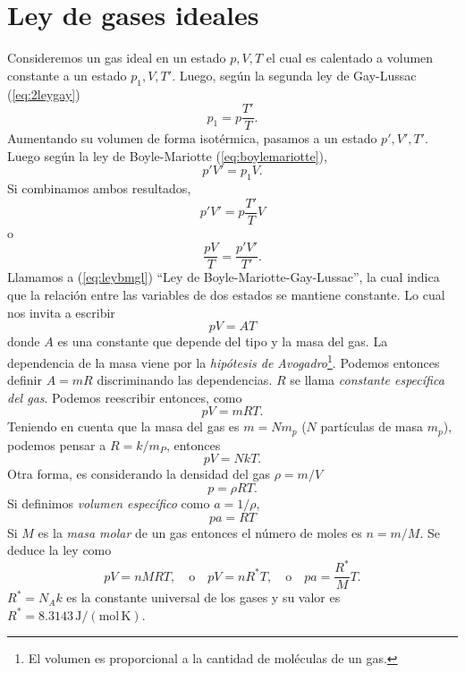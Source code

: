 \documentclass[openany]{book}
\begin{document}
\section{Ley de gases ideales}
Consideremos un gas ideal en un estado $p,V,T$ el cual es calentado a volumen constante a un estado $p_1,V,T'$. Luego, según la segunda ley de Gay-Lussac (\ref{eq:2leygay})
\begin{equation*}
	p_1=p\frac{T'}{T}.
\end{equation*}
Aumentando su volumen de forma isotérmica, pasamos a un estado $p',V',T'$. Luego según la ley de Boyle-Mariotte (\ref{eq:boylemariotte}),
\begin{equation*}
	p'V'=p_1V.
\end{equation*}
Si combinamos ambos resultados,
\begin{equation*}
	p'V'=p\frac{T'}{T}V
\end{equation*}
o
\begin{equation}\label{eq:leybmgl}
	\frac{pV}{T}=\frac{p'V'}{T'}.
\end{equation}
Llamamos a (\ref{eq:leybmgl}) ``Ley de Boyle-Mariotte-Gay-Lussac'', la cual indica que la relación entre las variables de dos estados se mantiene constante. Lo cual nos invita a escribir
\begin{equation*}
	pV=AT
\end{equation*}
donde $A$ es una constante que depende del tipo y la masa del gas. La dependencia de la masa viene por la \emph{hipótesis de Avogadro}\footnote{El volumen es proporcional a la cantidad de moléculas de un gas.}. Podemos entonces definir $A=mR$ discriminando las dependencias. $R$ se llama \emph{constante específica del gas}. Podemos reescribir entonces, como
\begin{equation}\label{eq:pvmrt}
	pV=mRT.
\end{equation}
Teniendo en cuenta que la masa del gas es $m=Nm_p$ ($N$ partículas de masa $m_p$), podemos pensar a $R=k/m_P$, entonces
\begin{equation}\label{eq:pvnkt}
	pV=NkT.
\end{equation}
Otra forma, es considerando la densidad del gas $\rho=m/V$
\begin{equation}
	p=\rho RT.
\end{equation}
Si definimos \emph{volumen específico} como $a=1/\rho$,
\begin{equation}
	pa=RT
\end{equation}
Si $M$ es la \emph{masa molar} de un gas entonces el número de moles es $n=m/M$. Se deduce la ley como
\begin{equation}
	pV=nMRT,\quad \mathrm{o}\quad pV=nR^*T,\quad \mathrm{o}\quad pa=\frac{R^*}{M}T.
\end{equation}
$R^*=N_Ak$ es la constante universal de los gases y su valor es $R^*=8.3143\,\mathrm{J}/(\mathrm{mol\,K})$.
\end{document}
